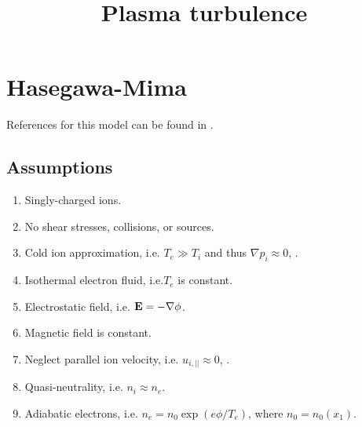 \documentclass[11pt]{article}
\title{Plasma turbulence}
\begin{document}
\maketitle

\section{Hasegawa-Mima}
References for this model can be found in \cite{hasegawa1977,horton1994}.

\subsection{Assumptions}
\begin{enumerate}
    \item Singly-charged ions. \label{it:hm_single_charge_ions}
    \item No shear stresses, collisions, or sources. \label{it:hm_no_shear_source_coll}
    \item Cold ion approximation, i.e. $T_e \gg T_i$ and thus $\nabla p_i \approx 0$, \cite{hasegawa1977}. \label{it:hm_cold}
    \item Isothermal electron fluid, i.e.\@ $T_e$ is constant. \label{it:hm_isothermal_electron}
    \item Electrostatic field, i.e. $\mathbf{E} = - \nabla \phi$. \label{it:hm_electrostatic}
    \item Magnetic field is constant.
    \item Neglect parallel ion velocity, i.e. $u_{i,||} \approx 0$, \cite{hasegawa1977}. \label{it:hm_par_ion}
    \item Quasi-neutrality, i.e. $n_i \approx n_e$. \label{it:hm_quasineutrality}
    \item Adiabatic electrons, i.e. $n_e = n_0 \exp (e\phi/T_e)$, where $n_0 = n_0(x_1)$. \label{it:hm_adiabatic}
\end{enumerate}

\end{document}

